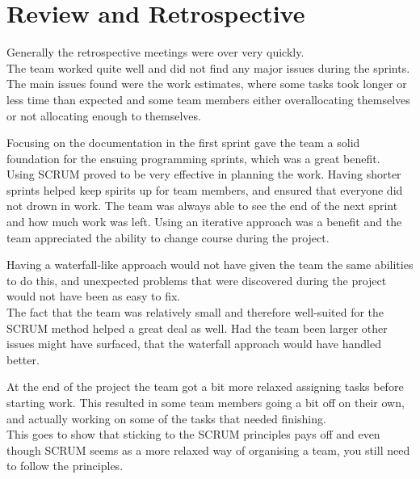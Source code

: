 \section{Review and Retrospective}

Generally the retrospective meetings were over very quickly.\\
The team worked quite well and did not find any major issues during the sprints.\\ 
The main issues found were the work estimates, where some tasks took longer or less time than expected and some team members either overallocating themselves or not allocating enough to themselves.

Focusing on the documentation in the first sprint gave the team a solid foundation for the ensuing programming sprints, which was a great benefit.\\
Using SCRUM proved to be very effective in planning the work. Having shorter sprints helped keep spirits up for team members, and ensured that everyone did not drown in work. The team was always able to see the end of the next sprint and how much work was left.
Using an iterative approach was a benefit and the team appreciated the ability to change course during the project.

Having a waterfall-like approach would not have given the team the same abilities to do this, and unexpected problems that were discovered during the project would not have been as easy to fix. \\
The fact that the team was relatively small and therefore well-suited for the SCRUM method helped a great deal as well. Had the team been larger other issues might have surfaced, that the waterfall approach would have handled better.

At the end of the project the team got a bit more relaxed assigning tasks before starting work. This resulted in some team members going a bit off on their own, and actually working on some of the tasks that needed finishing.\\
This goes to show that sticking to the SCRUM principles pays off and even though SCRUM seems as a more relaxed way of organising a team, you still need to follow the principles.